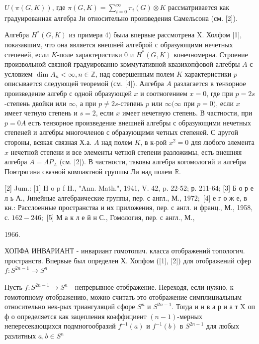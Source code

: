 \documentclass[10pt]{article}
\begin{document}
$U(\pi(G, K))$, где $\pi(G, K)=\sum_{i=0}^{\infty} \pi_{i}(G) \otimes K$ рассматривается как градуированная алгебра Ји относительно произведения Самельсона (см. [2]).



Алгебра $H^{*}(G, K)$ из примера 4) была впервые рассмотрена X. Холфом [1], показавшим, что она является внешней алгеброй с образующими нечетных степеней, если $K$-поле характеристики 0 и $H^{*}(G, K)$ конечномерна. Строение произвольной связной градуированно коммутативной квазихопфовой алгебры $A$ с условием $\operatorname{dim} A_{n}<\infty, n \in \mathbb{Z}$, над совершенным полем $K$ характеристики $p$ описывается следующей теоремой (см. [4]). Алгебра $A$ разлагается в тензорное произведение алгебр с одной образующей $x$ и соотногением $x=0$, где при $p=2 s$-степень двойки или $\infty$, а при $p \neq 2 s$-степень $p$ или $\infty(\infty$ при $p=0)$, если $x$ имеет четную степень и $s=2$, если $x$ имеет нечетную степень. В частности, при $p=0 A$ есть тензорное произведение внешней алгебры с образующими нечетных степеней и алгебры многочленов с образующими четных степеней. С другой стороны, всякая связная Х.а. $A$ над полем $K$, в к-рой $x^{2}=0$ для любого элемента $x$ нечетной степени и все элементы четной степени разложимы, есть внешняя алгебра $A=\Lambda P_{A}$ (см. [2]). В частности, таковы алгебра когомологий и алгебра Понтрягина связной компактной групшы Ли над полем $\mathbb{R}$.



[2] Jum.: [1] H o p f H., "Ann. Math.", 1941, V. 42, p. 22-52; р. 211-64; [3] Б о р е л ь А., Јинейные алгебраические группы, пер. с англ., М., $1972 ;$ [4] е г о ж е, в кн.: Расслоенные пространства и их приложения, пер. с англ. и франц., М., 1958, с. $162-246 ;$ [5] М а к л е й н С., Гомология, пер. с англ., М.,

1966.



ХОПФА ИНВАРИАНТ - инвариант гомотопич. класса отображений топологич. пространств. Впервые был определен Х. Хопфом ([1], [2]) для отображений сфер $f: S^{2 n-1} \rightarrow S^{n}$



Пусть $f: S^{2 n-1} \longrightarrow S^{n}$ - непрерывное отображение. Переходя, если нужно, к гомотопному отображению, можно считать это отображение симплициальным относительно нек-рых триангуляций сфоре $S^{n}$ и $S^{2 n-1}$. Тогда и н в а р и а т X оп ф о определяется как зацепления коәффициент $(n-1)$-мерных непересекающихся подмногообразий $f^{-1}(a)$ и $f^{-1}(b)$ в $S^{2 n-1}$ для любых разлитных $a, b \in S^{n}$
\end{document}
